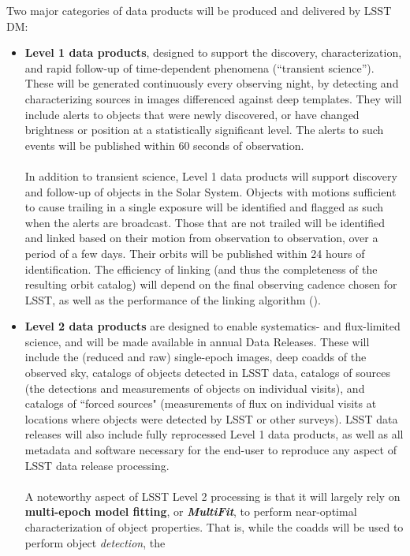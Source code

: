 \documentclass[11pt,twoside]{article}
\begin{document}
Two major categories of data products will be produced and delivered by LSST DM:
\begin{itemize}
\item {\bf Level 1 data products}, designed to support the discovery,
  characterization, and rapid follow-up of time-dependent phenomena
  (``transient science''). These will be generated continuously every
  observing night, by detecting and characterizing sources in images
  differenced against deep templates. They will include alerts to
  objects that were newly discovered, or have changed brightness or
  position at a statistically significant level. The alerts to such
  events will be published within 60   seconds of observation.\\ 
\\
In addition to transient science, Level 1 data products will support
discovery and follow-up of objects in the Solar System. Objects with
motions sufficient to cause trailing in a single exposure will be
identified and flagged as such when the alerts are broadcast. Those
that are not trailed will be identified and linked based on their
motion from observation to observation, over a period of a few
days. Their orbits will be published within 24 hours of
identification. The efficiency of linking (and thus the completeness
of the resulting orbit catalog) will depend on the final observing
cadence chosen for LSST, as well as the performance of the linking
algorithm (\citep{MOPSIAU}).
\item {\bf Level 2 data products} are designed to enable systematics- and flux-limited science, and will be made available in annual Data Releases. These will include the (reduced and raw) single-epoch images, deep coadds of the observed sky, catalogs of objects detected in LSST data, catalogs of sources (the detections and measurements of objects on individual visits), and catalogs of ``forced sources" (measurements of flux on individual visits at locations where objects were detected by LSST or other surveys). LSST data releases will also include fully reprocessed Level 1 data products, as well as all metadata and software necessary for the end-user to reproduce any aspect of LSST data release processing.\\
\\
A noteworthy aspect of LSST Level 2 processing is that it will largely
rely on {\bf multi-epoch model fitting}, or {\bf \em MultiFit}, to
perform near-optimal characterization of object properties. That is,
while the coadds will be used to perform object {\em detection}, the

\end{itemize}
\end{document}
